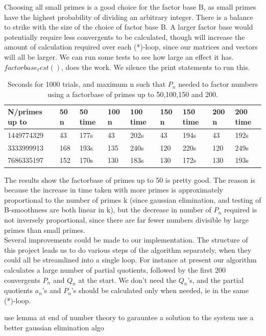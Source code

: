 \documentclass[10pt,a4paper]{report}
\begin{document}
Choosing all small primes is a good choice for the factor base B, as small primes have the highest probability of dividing an arbitrary integer. There is a balance to strike with the size of the choice of factor base B. A larger factor base would potentially require less convergents to be calculated, though will increase the amount of calculation required over each (*)-loop, since our matrices and vectors will all be larger. We can run some tests to see how large an effect it has. $factorbase_test()$, does the work. We silence the print statements to run this.\\

\begin{table}[h]
\centering
\begin{tabular}{|l|l|l|l|l|l|l|l|l|}
\hline
N/primes up to & 50 n & 50 time & 100 n & 100 time & 150 n & 150 time & 200 n & 200 time \\ \hline
1449774329     & 43   & 177s    & 43    & 202s     & 43    & 194s     & 43    & 192s     \\ \hline
3333999913     & 168  & 193s    & 135   & 240s     & 120   & 220s     & 120   & 249s     \\ \hline
7686335197     & 152  & 170s    & 130   & 183s     & 130   & 172s     & 130   & 193s     \\ \hline
\end{tabular}
\caption{Seconds for 1000 trials, and maximum n such that $P_n$ needed to factor numbers using a factorbase of primes up to 50,100,150 and 200.}
\end{table}


The results show the factorbase of primes up to 50 is pretty good. The reason is because the increase in time taken with more primes is approximately proportional to the number of primes k (since gaussian elimination, and testing of B-smoothness are both linear in k), but the decrease in number of $P_n$ required is not inversely proportional, since there are far fewer numbers divisible by large primes than small primes.\\


Several improvements could be made to our implementation. The structure of this project leads us to do various steps of the algorithm separately, when they could all be streamlined into a single loop. For instance at present our algorithm calculates a large number of partial quotients, followed by the first 200 convergents $P_n$ and $Q_n$ at the start. We don't need the $Q_n$'s, and the partial quotients $a_n$'s and $P_n$'s should be calculated only when needed, ie in the same (*)-loop. 

use lemma at end of number theory to garauntee a solution to the system
use a better gaussian elimination algo
\end{document}
